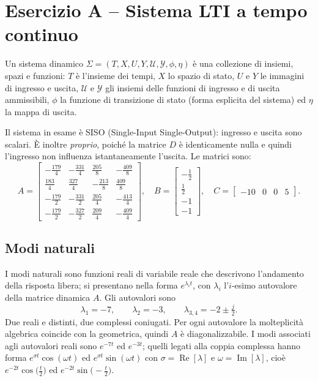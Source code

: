 \section{Esercizio A -- Sistema LTI a tempo continuo}

Un sistema dinamico $\Sigma=(T,X,U,Y,\mathcal{U},\mathcal{Y},\phi,\eta)$ è una
collezione di insiemi, spazi e funzioni: $T$ è l'insieme dei tempi, $X$ lo spazio
di stato, $U$ e $Y$ le immagini di ingresso e uscita, $\mathcal{U}$ e $\mathcal{Y}$
gli insiemi delle funzioni di ingresso e di uscita ammissibili, $\phi$ la funzione
di transizione di stato (forma esplicita del sistema) ed $\eta$ la mappa di uscita.

Il sistema in esame è SISO (Single-Input Single-Output): ingresso e uscita sono
scalari. È inoltre \emph{proprio}, poiché la matrice $D$ è identicamente nulla e
quindi l'ingresso non influenza istantaneamente l'uscita. Le matrici sono:
\[
A=\begin{bmatrix}
-\tfrac{179}{4} & -\tfrac{331}{4} & \tfrac{205}{8} & -\tfrac{409}{8}\\[2pt]
\tfrac{183}{4} & \tfrac{327}{4} & -\tfrac{213}{8} & \tfrac{409}{8}\\[2pt]
-\tfrac{179}{2} & -\tfrac{331}{2} & \tfrac{205}{4} & -\tfrac{413}{4}\\[2pt]
-\tfrac{179}{2} & -\tfrac{327}{2} & \tfrac{209}{4} & -\tfrac{409}{4}
\end{bmatrix},\quad
B=\begin{bmatrix}-\tfrac12\\[2pt]\tfrac12\\[2pt]-1\\[2pt]-1\end{bmatrix},\quad
C=\begin{bmatrix}-10 & 0 & 0 & 5\end{bmatrix}.
\]

\subsection{Modi naturali}
I modi naturali sono funzioni reali di variabile reale che descrivono l'andamento
della risposta libera; si presentano nella forma $e^{\lambda_i t}$, con $\lambda_i$
l'$i$-esimo autovalore della matrice dinamica $A$. Gli autovalori sono
\[
\lambda_1=-7,\qquad \lambda_2=-3,\qquad \lambda_{3,4}=-2\pm\tfrac{j}{2}.
\]
Due reali e distinti, due complessi coniugati. Per ogni autovalore la molteplicità
algebrica coincide con la geometrica, quindi $A$ è diagonalizzabile. I modi associati
agli autovalori reali sono $e^{-7t}$ ed $e^{-3t}$; quelli legati alla coppia complessa
hanno forma $e^{\sigma t}\cos(\omega t)$ ed $e^{\sigma t}\sin(\omega t)$ con
$\sigma=\operatorname{Re}[\lambda]$ e $\omega=\operatorname{Im}[\lambda]$, cioè
$e^{-2t}\cos\!\big(\tfrac{t}{2}\big)$ ed $e^{-2t}\sin\!\big(-\tfrac{t}{2}\big)$.

